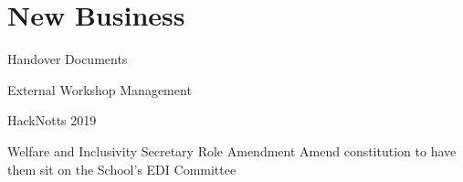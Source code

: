 \documentclass[11pt,hacksoc,agenda]{meetingmins}
\begin{document}
\section{New Business}
\begin{items}
	
	\item
	Handover Documents
	
	\item
	External Workshop Management
	
	\item
	HackNotts 2019
	
	\item
	Welfare and Inclusivity Secretary Role Amendment
		\subitem
		Amend constitution to have them sit on the School's EDI Committee
	
\end{items}

\vspace{1em}
\nextmeeting{}
\end{document}
